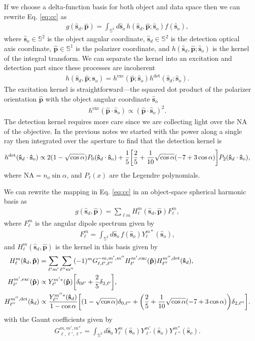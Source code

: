 \documentclass[11pt]{article}
\providecommand{\so}{\mathbf{\hat{s}}_o}
\providecommand{\sd}{\mathbf{\hat{s}}_d}
\providecommand{\pp}{\mathbf{\hat{p}}}
\providecommand{\mbb}[1]{\mathbb{#1}}
\providecommand{\ints}[1]{\int_{\mbb{S}^{#1}}}
\let\originalleft\left
\let\originalright\right
\renewcommand{\left}{\mathopen{}\mathclose\bgroup\originalleft}
\renewcommand{\right}{\aftergroup\egroup\originalright}
\begin{document}
If we choose a delta-function basis for both object and data space then we can
rewrite Eq. \eqref{eq:cc} as 
\begin{align}
  g(\sd, \pp) = \ints{2}d\so\, h(\sd,\pp;\so)f(\so),\label{eq:fwd}
\end{align}
where $\so \in \mbb{S}^2$ is the object angular coordinate, $\sd \in \mbb{S}^2$
is the detection optical axis coordinate, $\pp \in \mbb{S}^1$ is the polarizer
coordinate, and $h(\sd,\pp;\so)$ is the kernel of the integral transform. We can
separate the kernel into an excitation and detection part since these processes
are incoherent
\begin{align}
  h(\sd, \pp;\so) = h^{\text{exc}}(\pp;\so)h^{\text{det}}(\sd;\so). \label{eq:kern}
\end{align}
The excitation kernel is straightforward---the squared dot product of the
polarizer orientation $\pp$ with the object angular coordinate $\so$
\begin{align}
  h^{\text{exc}}(\pp\cdot\so) \propto (\pp\cdot\so)^2. \label{eq:exckern}
\end{align}
The detection kernel requires more care since we are collecting light over the
NA of the objective. In the previous notes we started with the power along a
single ray then integrated over the aperture to find that the detection kernel is
\begin{align}
  h^{\text{det}}(\sd\cdot\so) \propto 2(1 - \sqrt{\cos\alpha})P_0(\sd\cdot\so) + \frac{1}{5}\left[\frac{2}{5} + \frac{1}{10}\sqrt{\cos\alpha}(-7+3\cos\alpha)\right]P_2(\sd\cdot\so),
\end{align}
where $\text{NA} = n_o\sin\alpha$, and $P_{\ell}(x)$ are the Legendre
polynomials.

We can rewrite the mapping in Eq. \eqref{eq:cc} in an object-space spherical
harmonic basis as
\begin{align}
  g(\sd, \pp) = \sum_{\ell m}H_\ell^m(\sd, \pp)F_\ell^m,\label{eq:fwdsh}
\end{align}
where $F_\ell^m$ is the angular dipole spectrum given by 
\begin{align}
  F_\ell^m = \int_{\mbb{S}^2}d\so\, f(\so)Y_\ell^{m*}(\so),
\end{align}
and $H_\ell^m(\sd, \pp)$ is the kernel in this basis given by
\begin{align}
  H_\ell^m(\sd, \pp) &= \sum_{\ell' m'}\sum_{\ell'' m''}(-1)^m G_{\ell,\ell',\ell''}^{-m,m',m''}H_{\ell'}^{m',\text{exc}}(\pp)H_{\ell''}^{m'',\text{det}}(\sd),\label{eq:triple4}\\
    H_{\ell'}^{m',\text{exc}}(\pp) &\propto Y_{\ell'}^{m'*}(\pp)\left[\delta_{0\ell'} + \frac{2}{5}\delta_{2,\ell'}\right],\label{eq:dipexc}\\
    H_{\ell''}^{m'',\text{det}}(\sd) &\propto \frac{Y_{\ell''}^{m''*}(\sd)}{1 - \cos\alpha}\left[(1 - \sqrt{\cos\alpha})\delta_{0,\ell''} + \left(\frac{2}{5} + \frac{1}{10}\sqrt{\cos\alpha}(-7+3\cos\alpha)\right)\delta_{2,\ell''}\right].\label{eq:dipdet}
\end{align}
with the Gaunt coefficients given by 
\begin{align}
  G_{\ell,\ell',\ell''}^{m,m',m''} = \ints{2}d\so\, Y_\ell^{m}(\so)Y_{\ell'}^{m'}(\so)Y_{\ell''}^{m''}(\so).
\end{align}
\end{document}
